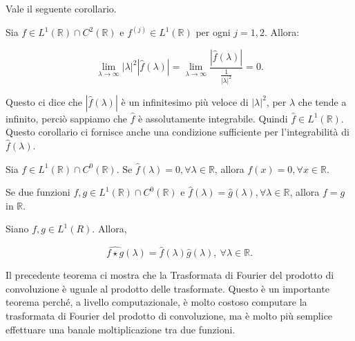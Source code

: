 Vale il seguente corollario.

\begin{corollary}
    Sia $f \in L^1(\mathbb{R}) \cap C^2(\mathbb{R})$ e $f^{\left(j\right)} \in
        L^1(\mathbb{R})$ per ogni $j = 1, 2$. Allora:
    
    $$
        \lim_{\lambda \rightarrow \infty} \left| \lambda \right|^2 \left|
        \hat{f}(\lambda) \right|  = \lim_{\lambda \rightarrow \infty}
        \frac{\left|\hat{f}(\lambda)\right|}{ \frac{1}{ \left| \lambda
                \right|^2}} = 0.
    $$
\end{corollary}

Questo ci dice che $\left|\hat{f}(\lambda)\right|$ è un infinitesimo più veloce di
$\left|\lambda\right|^2$, per $\lambda$ che tende a infinito, perciò sappiamo che $\hat{f}$ è
assolutamente integrabile. Quindi $\hat{f} \in L^1(\mathbb{R})$. Questo
corollario ci fornisce anche una condizione sufficiente per l'integrabilità di
$\hat{f}(\lambda)$.

\begin{theorem}
    Sia $f \in L^1(\mathbb{R}) \cap C^0(\mathbb{R})$.
    Se $\hat{f}(\lambda) = 0, \forall \lambda \in \mathbb{R}$, allora $f(x) = 0, \forall x \in \mathbb{R}$.\\
\end{theorem}

\begin{corollary}
    Se due funzioni $f, g \in L^1(\mathbb{R}) \cap C^0(\mathbb{R})$ e $\hat{f}(\lambda) = \hat{g}(\lambda), \forall \lambda \in \mathbb{R}$,
    allora $f = g$ in $\mathbb{R}$.
\end{corollary}

\begin{theorem}
    Siano $f, g \in L^1(R)$. Allora,
    
    $$
        \widehat{f \star g}(\lambda) = \hat{f}(\lambda) \hat{g}(\lambda), \
        \forall \lambda \in \mathbb{R}.
    $$
\end{theorem}

Il precedente teorema ci mostra che la Trasformata di Fourier del prodotto di
convoluzione è uguale al prodotto delle trasformate. Questo è un importante teorema
perché, a livello computazionale, è molto costoso computare la trasformata di Fourier
del prodotto di convoluzione, ma è molto più semplice effettuare una banale moltiplicazione
tra due funzioni.